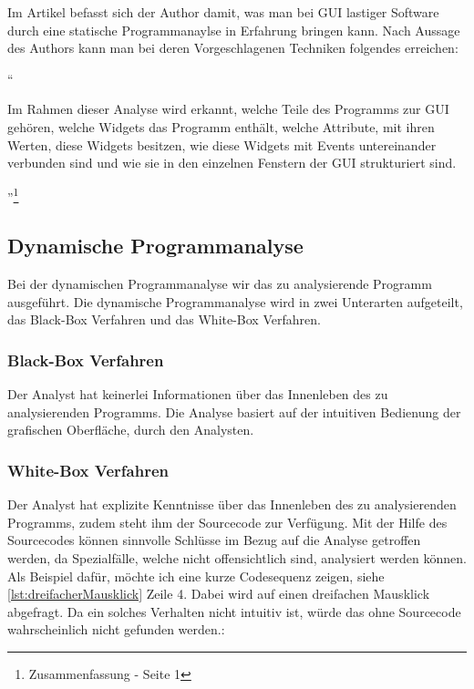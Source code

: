   Im Artikel \cite{GUIAnalysenUndBibliotheken} befasst sich der Author damit,
  was man bei GUI lastiger Software durch eine statische Programmanaylse in
  Erfahrung bringen kann. Nach Aussage des Authors kann man bei deren
  Vorgeschlagenen Techniken folgendes erreichen:
  
  ``\begin{itshape}Im Rahmen dieser Analyse wird erkannt, welche Teile des
  Programms zur GUI gehören, welche Widgets das Programm enthält, welche
  Attribute, mit ihren Werten, diese Widgets besitzen, wie diese Widgets mit
  Events untereinander verbunden sind und wie sie in den einzelnen Fenstern der
  GUI strukturiert
  sind.\end{itshape}''\footnote{\cite{GUIAnalysenUndBibliotheken}
  Zusammenfassung - Seite 1}
    
  \subsection{Dynamische Programmanalyse}
  
  Bei der dynamischen Programmanalyse wir das zu analysierende Programm 
  ausgeführt. Die dynamische Programmanalyse wird in zwei Unterarten aufgeteilt,
  das Black-Box Verfahren und das White-Box Verfahren.
    
  \subsubsection{Black-Box Verfahren}
  
  Der Analyst hat keinerlei Informationen über das Innenleben des zu
  analysierenden Programms. Die Analyse basiert auf der intuitiven Bedienung der
  grafischen Oberfläche, durch den Analysten.
  
  \subsubsection{White-Box Verfahren}
  
  Der Analyst hat explizite Kenntnisse über das Innenleben des zu
  analysierenden Programms, zudem steht ihm der Sourcecode zur Verfügung. Mit
  der Hilfe des Sourcecodes können sinnvolle Schlüsse im Bezug auf die Analyse
  getroffen werden, da Spezialfälle, welche nicht offensichtlich sind,
  analysiert werden können. Als Beispiel dafür, möchte ich eine kurze
  Codesequenz zeigen, siehe \ref{lst:dreifacherMausklick} Zeile 4. Dabei wird
  auf einen dreifachen Mausklick abgefragt. Da ein solches Verhalten nicht
  intuitiv ist, würde das ohne Sourcecode wahrscheinlich nicht gefunden werden.:
  \newline
  
